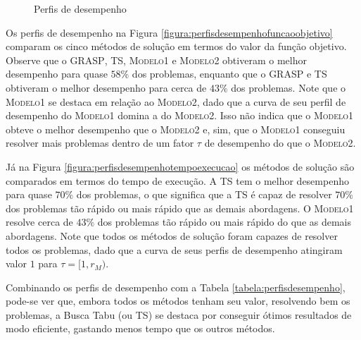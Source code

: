 \documentclass{MO824}
\begin{document}
\begin{figure}[ht]
    \centering
    \caption{Perfis de desempenho}
\end{figure}

Os perfis de desempenho na Figura \ref{figura:perfisdesempenhofuncaoobjetivo} comparam os cinco métodos de solução em termos do valor da função objetivo. Observe que o \textsc{GRASP}, \textsc{TS}, \textsc{Modelo1} e \textsc{Modelo2} obtiveram o melhor desempenho para quase $58\%$ dos problemas, enquanto que o \textsc{GRASP} e \textsc{TS} obtiveram o melhor desempenho para cerca de $43\%$ dos problemas. Note que o \textsc{Modelo1} se destaca em relação ao \textsc{Modelo2}, dado que a curva de seu perfil de desempenho do \textsc{Modelo1} domina a do \textsc{Modelo2}. Isso não indica que o \textsc{Modelo1} obteve o melhor desempenho que o \textsc{Modelo2} e, sim, que o \textsc{Modelo1} conseguiu resolver mais problemas dentro de um fator $\tau$ de desempenho do que o \textsc{Modelo2}.

Já na Figura \ref{figura:perfisdesempenhotempoexecucao} os métodos de solução são comparados em termos do tempo de execução. A \textsc{TS} tem o melhor desempenho para quase $70\%$ dos problemas, o que significa que a \textsc{TS} é capaz de resolver $70\%$ dos problemas tão rápido ou mais rápido que as demais abordagens. O \textsc{Modelo1} resolve cerca de $43\%$ dos problemas tão rápido ou mais rápido do que as demais abordagens. Note que todos os métodos de solução foram capazes de resolver todos os problemas, dado que a curva de seus perfis de desempenho atingiram valor $1$ para $\tau = [1, r_{M})$.

Combinando os perfis de desempenho com a Tabela \ref{tabela:perfisdesempenho}, pode-se ver que, embora todos os métodos tenham seu valor, resolvendo bem os problemas, a Busca Tabu (ou \textsc{TS}) se destaca por conseguir ótimos resultados de modo eficiente, gastando menos tempo que os outros métodos.

\vspace{-0.5cm}

{\footnotesize }

\clearpage
\end{document}
